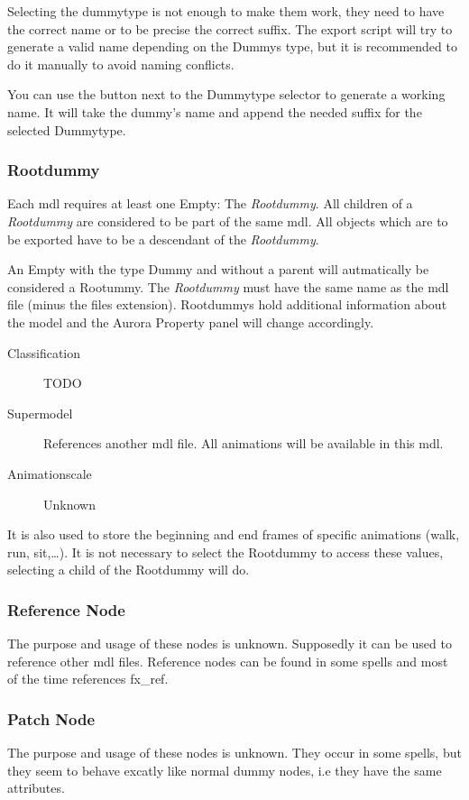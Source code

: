 Selecting the dummytype is not enough to make them work, they need to have
the correct name or to be precise the correct suffix.
The export script will try to generate a valid name depending on
the Dummys type, but it is recommended to do it manually to avoid naming
conflicts.

You can use the button next to the Dummytype selector to generate a
working name. It will take the dummy's name and append the needed suffix for
the selected Dummytype.

\subsubsection{Rootdummy}
Each mdl requires at least one Empty: The {\textit{Rootdummy}}. All children
of a {\textit{Rootdummy}} are considered to be part of the same mdl. All
objects which are to be exported have to be a descendant of
the {\textit{Rootdummy}}.

An Empty with the type Dummy and without a parent will autmatically be
considered a Rootummy. The {\textit{Rootdummy}} must have the same name as the
mdl file (minus the files extension). Rootdummys hold additional
information about the model and the Aurora Property panel will
change accordingly.

\begin{description}
    \item[Classification] TODO
    \item[Supermodel] References another mdl file. All animations will be available in this mdl.
    \item[Animationscale] Unknown
\end{description}
It is also used to store the beginning and end frames of specific animations
(walk, run, sit,\ldots). It is not necessary to select the Rootdummy to access these
values, selecting a child of the Rootdummy will do.

\subsubsection{Reference Node}
The purpose and usage of these nodes is unknown. Supposedly it can be used to
reference other mdl files. Reference nodes can be found in some spells and
most of the time references fx\_ref.

\subsubsection{Patch Node}
The purpose and usage of these nodes is unknown. They occur in some spells, but
they seem to behave excatly like normal dummy nodes, i.e they have the same
attributes.


